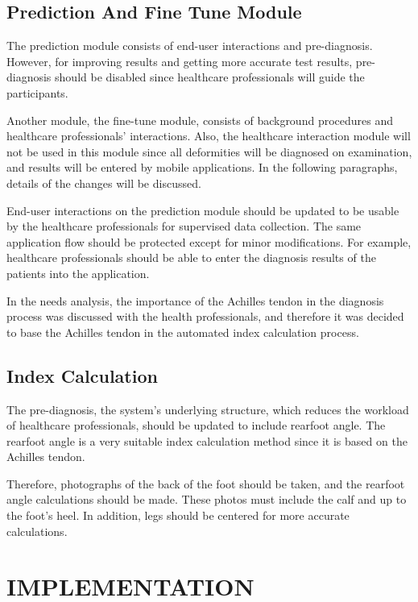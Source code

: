 \subsection{ Prediction And Fine Tune Module }

The prediction module consists of end-user interactions and pre-diagnosis. However, for improving results and getting more accurate test results, pre-diagnosis should be disabled since healthcare professionals will guide the participants. 

Another module, the fine-tune module, consists of background procedures and healthcare professionals' interactions. Also, the healthcare interaction module will not be used in this module since all deformities will be diagnosed on examination, and results will be entered by mobile applications. In the following paragraphs, details of the changes will be discussed.

End-user interactions on the prediction module should be updated to be usable by the healthcare professionals for supervised data collection. The same application flow should be protected except for minor modifications. For example, healthcare professionals should be able to enter the diagnosis results of the patients into the application.

In the needs analysis, the importance of the Achilles tendon in the diagnosis process was discussed with the health professionals, and therefore it was decided to base the Achilles tendon in the automated index calculation process.

\subsection{ Index Calculation }

The pre-diagnosis, the system's underlying structure, which reduces the workload of healthcare professionals, should be updated to include rearfoot angle. The rearfoot angle is a very suitable index calculation method since it is based on the Achilles tendon.

Therefore, photographs of the back of the foot should be taken, and the rearfoot angle calculations should be made. These photos must include the calf and up to the foot's heel. In addition, legs should be centered for more accurate calculations.

\section{IMPLEMENTATION}\label{sec:StudyIIImplementation}

